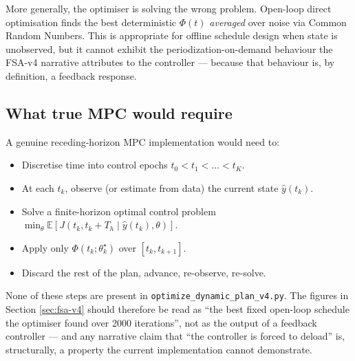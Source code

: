 More generally, the optimiser is solving the wrong problem. Open-loop direct optimisation finds the best deterministic $\Phi(t)$ \emph{averaged} over noise via Common Random Numbers. This is appropriate for offline schedule design when state is unobserved, but it cannot exhibit the periodization-on-demand behaviour the FSA-v4 narrative attributes to the controller --- because that behaviour is, by definition, a feedback response.

\subsection{What true MPC would require}

A genuine receding-horizon MPC implementation would need to:
\begin{itemize}
    \item Discretise time into control epochs $t_0 < t_1 < \ldots < t_K$.
    \item At each $t_k$, observe (or estimate from data) the current state $\hat y(t_k)$.
    \item Solve a finite-horizon optimal control problem $\min_\theta \mathbb{E}[ J(t_k, t_k + T_h \mid \hat y(t_k), \theta) ]$.
    \item Apply only $\Phi(t_k; \theta^\star_k)$ over $[t_k, t_{k+1}]$.
    \item Discard the rest of the plan, advance, re-observe, re-solve.
\end{itemize}

None of these steps are present in \texttt{optimize\_dynamic\_plan\_v4.py}. The figures in Section \ref{sec:fsa-v4} should therefore be read as ``the best fixed open-loop schedule the optimiser found over 2000 iterations'', not as the output of a feedback controller --- and any narrative claim that ``the controller is forced to deload'' is, structurally, a property the current implementation cannot demonstrate.
